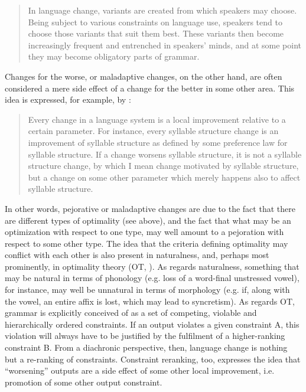 \documentclass[output=paper,hidelinks]{langscibook}
\begin{document}
\begin{quote}\sloppy
In language change, variants are created from which speakers may choose. Being subject to various constraints on language use, speakers tend to choose those variants that suit them best. These variants then become increasingly frequent and entrenched in speakers’ minds, and at some point they may become obligatory parts of grammar. \citep[203]{Haspelmath1999optimality}
\end{quote}

Changes for the worse, or maladaptive changes, on the other hand, are often considered a mere side effect of a change for the better in some other area. This idea is expressed, for example, by \citet{Vennemann_1988}:

\begin{quote}
Every change in a language system is a local improvement relative to a certain parameter. For instance, every syllable structure change is an improvement of syllable structure as defined by some preference law for syllable structure. If a change worsens syllable structure, it is not a syllable structure change, by which I mean change motivated by syllable structure, but a change on some other parameter which merely happens also to affect syllable structure. 
\citep[1--2]{Vennemann_1988}
\end{quote}

In other words, pejorative or maladaptive changes are due to the fact that there are different types of optimality (see \citealt[102]{Langacker_1977} above), and the fact that what may be an optimization with respect to one type, may well amount to a pejoration with respect to some other type. The idea that the criteria defining optimality may conflict with each other is also present in naturalness, and, perhaps most prominently, in optimality theory (OT, \citealt{Prince_1993}). As regards naturalness, something that may be natural in terms of phonology (e.g. loss of a word-final unstressed vowel), for instance, may well be unnatural in terms of morphology (e.g. if, along with the vowel, an entire affix is lost, which may lead to syncretism). As regards OT, grammar is explicitly conceived of as a set of competing, violable and hierarchically ordered constraints. If an output violates a given constraint A, this violation will always have to be justified by the fulfilment of a higher-ranking constraint B. From a diachronic perspective, then, language change is nothing but a re-ranking of constraints. Constraint reranking, too, expresses the idea that ``worsening'' outputs are a side effect of some other local improvement, i.e. promotion of some other output constraint. 
\end{document}
